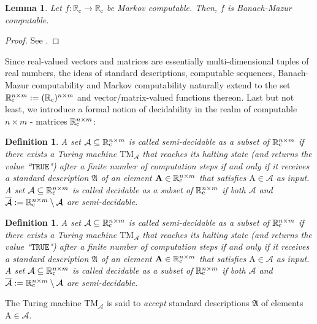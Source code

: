 \documentclass[conference]{IEEEtran}
\def\A{{\mathcal A}}
\def\RR{{\mathbb R}}
\newcommand{\RRc}{\RR_{\mathrm{c}}}
\def\mA{\bm{\mathrm{A}}}
\newcommand{\TM}{\mathrm{TM}}
\newcommand{\RRcP}[1]{\mathrlap{\phantom{\RR}_{\mathrm{c}}}\RR^{#1}}
\newtheorem{Definition}[Theorem]{Definition}
\newtheorem{Lemma}[Theorem]{Lemma}
\begin{document}
	\begin{Lemma}	Let \(f : \RRc \to \RRc\) be Markov computable. Then, \(f\) is Banach-Mazur computable.	
	\end{Lemma}\begin{proof}
					See \cite{AB14}.
	\end{proof}

	\noindent Since real-valued vectors and matrices are essentially multi-dimensional tuples of real numbers, the ideas of standard descriptions, computable sequences,
	Banach-Mazur computability and Markov computability naturally extend to the set \(\RRcP{n\times m} := (\RRc)^{n\times m}\) and vector/matrix-valued functions thereon. 
	{\color{red} Last but not least, we introduce a formal notion of decidability in the realm of computable \(n\times m\) - matrices \(\RRcP{n\times m}\):}

	{\color{red}\begin{Definition}  
						A set \(\A \subseteq \RRcP{n\times m}\) is called \emph{semi-decidable} as a subset of \(\RRcP{n\times m}\) 
						if there exists a Turing machine \(\TM_{\A}\) that reaches its halting state (and returns the value ``\(\mathtt{TRUE}\)") 
						after a finite number of computation steps if and only if it receives a standard description \(\mathfrak{A}\) of an element 
						\(\mA \in \RRcP{n\times m}\) that satisfies \(\mA\in\A\) as input. A set \(\A \subseteq \RRcP{n\times m}\) is called 
						\emph{decidable} as a subset of \(\RRcP{n\times m}\) if both \(\A\) and \(\overline{\A} := \RRcP{n\times m}\setminus\A\) are semi-decidable.
	\end{Definition}} 
	
	\begin{Definition}  \label{semi}
						A set \(\A \subseteq \RRcP{n\times m}\) is called \emph{semi-decidable} as a subset of \(\RRcP{n\times m}\) 
						if there exists a Turing machine \(\TM_{\A}\) that reaches its halting state (and returns the value ``\(\mathtt{TRUE}\)") 
						after a finite number of computation steps if and only if it receives a standard description \(\mathfrak{A}\) of an element 
						\(\mA \in \RRcP{n\times m}\) that satisfies \(\mA\in\A\) as input. A set \(\A \subseteq \RRcP{n\times m}\) is called 
						\emph{decidable} as a subset of \(\RRcP{n\times m}\) if both \(\A\) and \(\overline{\A} := \RRcP{n\times m}\setminus\A\) are semi-decidable.
	\end{Definition} 
	
	\noindent The Turing machine \(\TM_\A\) is said to \emph{accept} standard descriptions \(\mathfrak{A}\) of elements \(\mA\in\A\).
	
\end{document}
